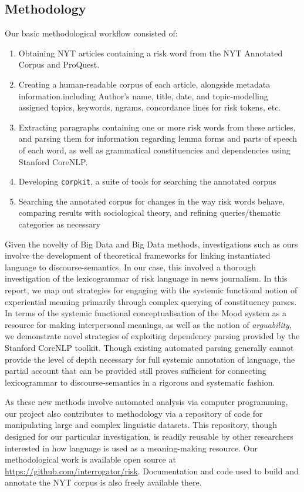 \subsection{Methodology}

Our basic methodological workflow consisted of:

\begin{enumerate}
    \item Obtaining NYT articles containing a risk word from the NYT Annotated Corpus and ProQuest.
    \item Creating a human-readable corpus of each article, alongside metadata information.including Author's name, title, date, and topic-modelling assigned topics, keywords, ngrams, concordance lines for risk tokens, etc.
    \item Extracting paragraphs containing one or more risk words from these articles, and parsing them for information regarding lemma forms and parts of speech of each word, as well as grammatical constituencies and dependencies using Stanford CoreNLP.
    \item Developing \texttt{corpkit}, a suite of tools for searching the annotated corpus
    \item Searching the annotated corpus for changes in the way risk words behave, comparing results with sociological theory, and refining queries\slash thematic categories as necessary
\end{enumerate}

Given the novelty of Big Data and Big Data methods, investigations such as ours involve the development of theoretical frameworks for linking instantiated language to discourse-semantics. In our case, this involved a thorough investigation of the lexicogrammar of risk language in news journalism. In this report, we map out strategies for engaging with the systemic functional notion of experiential meaning primarily through complex querying of constituency parses. In terms of the systemic functional conceptualisation of the Mood system as a resource for making interpersonal meanings, as well as the notion of \emph{arguability}, we demonstrate novel strategies of exploiting dependency parsing provided by the Stanford CoreNLP toolkit. Though existing automated parsing generally cannot provide the level of depth necessary for full systemic annotation of language, the partial account that can be provided still proves sufficient for connecting lexicogrammar to discourse-semantics in a rigorous and systematic fashion.

As these new methods involve automated analysis via computer programming, our project also contributes to methodology via a repository of code for manipulating large and complex linguistic datasets. This repository, though designed for our particular investigation, is readily reusable by other researchers interested in how language is used as a meaning-making resource. Our methodological work is available open source at \url{https://github.com/interrogator/risk}. Documentation and code used to build and annotate the NYT corpus is also freely available there.


